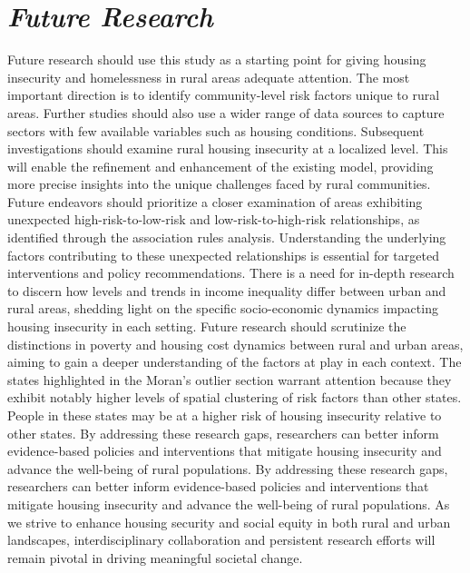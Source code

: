 \section{\textit{Future Research}}

Future research should use this study as a starting point for giving housing insecurity and homelessness in rural areas adequate attention. The most important direction is to identify community-level risk factors unique to rural areas. Further studies should also use a wider range of data sources to capture sectors with few available variables such as housing conditions. Subsequent investigations should examine rural housing insecurity at a localized level. This will enable the refinement and enhancement of the existing model, providing more precise insights into the unique challenges faced by rural communities.	Future endeavors should prioritize a closer examination of areas exhibiting unexpected high-risk-to-low-risk and low-risk-to-high-risk relationships, as identified through the association rules analysis. Understanding the underlying factors contributing to these unexpected relationships is essential for targeted interventions and policy recommendations. There is a need for in-depth research to discern how levels and trends in income inequality differ between urban and rural areas, shedding light on the specific socio-economic dynamics impacting housing insecurity in each setting. Future research should scrutinize the distinctions in poverty and housing cost dynamics between rural and urban areas, aiming to gain a deeper understanding of the factors at play in each context. The states highlighted in the Moran's outlier section warrant attention because they exhibit notably higher levels of spatial clustering of risk factors than other states. People in these states may be at a higher risk of housing insecurity relative to other states. By addressing these research gaps, researchers can better inform evidence-based policies and interventions that mitigate housing insecurity and advance the well-being of rural populations. By addressing these research gaps, researchers can better inform evidence-based policies and interventions that mitigate housing insecurity and advance the well-being of rural populations. As we strive to enhance housing security and social equity in both rural and urban landscapes, interdisciplinary collaboration and persistent research efforts will remain pivotal in driving meaningful societal change. 

\endinput